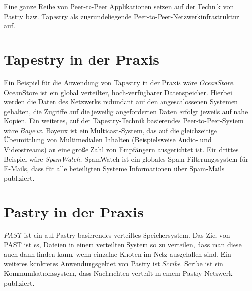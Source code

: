 Eine ganze Reihe von Peer-to-Peer Applikationen setzen auf der Technik von
Pastry bzw. Tapestry als zugrundeliegende Peer-to-Peer-Netzwerkinfrastruktur auf. 

\section{Tapestry in der Praxis}
Ein Beispiel für die Anwendung von Tapestry in der Praxis wäre
\textsl{OceanStore}. OceanStore ist ein global verteilter, hoch-verfügbarer
Datenspeicher. Hierbei werden die Daten des Netzwerks redundant auf den
angeschlossenen Systemen gehalten, die Zugriffe auf die jeweilig angeforderten
Daten erfolgt jeweils auf nahe Kopien. Ein weiteres, auf der Tapestry-Technik
basierendes Peer-to-Peer-System wäre \textsl{Bayeux.} Bayeux ist ein
Multicast-System, das auf die gleichzeitige Übermittlung von Multimedialen
Inhalten (Beispielsweise Audio- und Videostreams) an eine große Zahl von
Empfängern ausgerichtet ist. Ein drittes Beispiel wäre \textsl{SpamWatch.}
SpamWatch ist ein globales Spam-Filterungssystem für E-Mails, dass für alle
beteiligten Systeme Informationen über Spam-Mails publiziert.

\section{Pastry in der Praxis}
\textsl{PAST} ist ein auf Pastry basierendes verteiltes Speichersystem. Das 
Ziel von PAST ist es, Dateien in einem verteilten System so zu verteilen, dass 
man diese auch dann finden kann, wenn einzelne Knoten im Netz ausgefallen sind. 
Ein weiteres konkretes Anwendungsgebiet von Pastry ist \textsl{Scribe.} Scribe 
ist ein Kommunikationssystem, dass Nachrichten verteilt in einem 
Pastry-Netzwerk publiziert.

